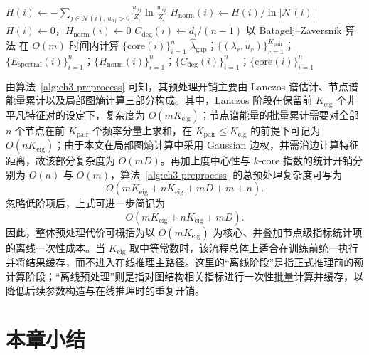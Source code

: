 \begin{algorithm}[htbp]
\begin{algorithmic}[1]
    \STATE $H(i) \leftarrow -\sum_{j\in\mathcal{N}(i),\,w_{ij}>0}\frac{w_{ij}}{Z_i}\ln\frac{w_{ij}}{Z_i}$
    \STATE $H_{\text{norm}}(i) \leftarrow H(i)/\ln|\mathcal{N}(i)|$
  \ELSE
    \STATE $H(i)\leftarrow 0$，$H_{\text{norm}}(i) \leftarrow 0$
  \ENDIF
  \STATE $C_{\text{deg}}(i) \leftarrow d_i/(n-1)$
\ENDFOR
\STATE 以 Batagelj--Zaversnik 算法\cite{BatageljZaversnik2003} 在 $O(m)$ 时间内计算 $\{\mathrm{core}(i)\}_{i=1}^n$
\RETURN $\hat{\lambda}_{\text{gap}}$；$\{(\lambda_r,u_r)\}_{r=1}^{K_{\text{pair}}}$；$\{E_{\text{spectral}}(i)\}_{i=1}^n$；$\{H_{\text{norm}}(i)\}_{i=1}^n$；$\{C_{\text{deg}}(i)\}_{i=1}^n$；$\{\mathrm{core}(i)\}_{i=1}^n$
\end{algorithmic}
\end{algorithm}

由算法~\ref{alg:ch3-preprocess} 可知，其预处理开销主要由 Lanczos 谱估计、节点谱能量累计以及局部图熵计算三部分构成。其中，Lanczos 阶段在保留前 $K_{\text{eig}}$ 个非平凡特征对的设定下，复杂度为 $O(mK_{\text{eig}})$；节点谱能量的批量累计需要对全部 $n$ 个节点在前 $K_{\text{pair}}$ 个频率分量上求和，在 $K_{\text{pair}}\leq K_{\text{eig}}$ 的前提下可记为 $O(nK_{\text{eig}})$；由于本文在局部图熵计算中采用 Gaussian 边权，并需沿边计算特征距离，故该部分复杂度为 $O(mD)$。再加上度中心性与 $k$-core 指数的统计开销分别为 $O(n)$ 与 $O(m)$，算法~\ref{alg:ch3-preprocess} 的总预处理复杂度可写为
\begin{equation}
  O(mK_{\text{eig}}+nK_{\text{eig}}+mD+m+n).
  \label{eq:ch3-preprocess-complexity-full}
\end{equation}
忽略低阶项后，上式可进一步简记为
\begin{equation}
  O(mK_{\text{eig}}+nK_{\text{eig}}+mD).
  \label{eq:ch3-preprocess-complexity}
\end{equation}
因此，整体预处理代价可概括为以 $O(mK_{\text{eig}})$ 为核心、并叠加节点级指标统计项的离线一次性成本。当 $K_{\text{eig}}$ 取中等常数时，该流程总体上适合在训练前统一执行并将结果缓存，而不进入在线推理主路径。这里的“离线阶段”是指正式推理前的预计算阶段；“离线预处理”则是指对图结构相关指标进行一次性批量计算并缓存，以降低后续参数构造与在线推理时的重复开销。

\section{本章小结}
\label{sec:ch3-ch3-summary}

